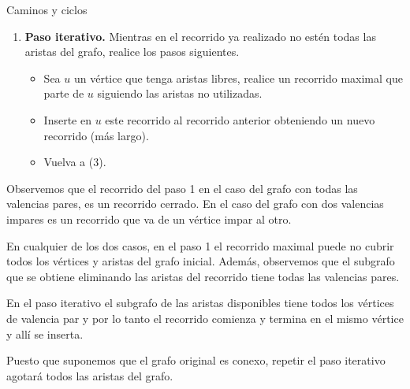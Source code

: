 \begin{section}{Caminos y ciclos}
\begin{enumerate}
    \item \textbf{Paso iterativo.} Mientras en el recorrido ya realizado no estén todas las aristas del grafo, realice los pasos siguientes.    
    \begin{itemize}
        \item Sea $u$  un vértice que tenga aristas libres, realice un recorrido maximal que parte de $u$ siguiendo las aristas no utilizadas. 
        \item Inserte en $u$ este recorrido al recorrido  anterior obteniendo un nuevo recorrido (más largo).
        \item  Vuelva a (3). 
    \end{itemize}
\end{enumerate}



Observemos que el recorrido del paso 1 en el caso del grafo con todas las valencias pares, es un recorrido cerrado. En el caso del grafo con dos valencias impares es un recorrido que va de un vértice impar al otro.  
    
En  cualquier de los dos casos,  en el paso 1 el recorrido maximal puede no cubrir todos los vértices y aristas del grafo inicial. Además,  observemos que el subgrafo que se obtiene eliminando las aristas del recorrido tiene todas las valencias pares. 

En  el paso iterativo el subgrafo de las aristas disponibles tiene todos los vértices de valencia par y por lo tanto el recorrido comienza y  termina en el mismo vértice y allí se inserta.

Puesto que suponemos que el grafo original es conexo, repetir el paso iterativo agotará todos las aristas del grafo.

\begin{comment}
El  algoritmo es el siguiente: 
\begin{enumerate}
    \item \textbf{Paso 1.} Elija cualquier vértice  inicial $v$ y haga una caminata  que no repita aristas y  que vuelva al vértice (de $v$ a $v$). 
    
    El recorrido formado de esta manera es un recorrido cerrado, pero puede no cubrir todos los vértices y aristas del grafo inicial.

    \item \textbf{Paso iterativo} Mientras exista un vértice $u$ en la caminata ya realizada, pero que tenga aristas que no formen parte de la caminata, inicie otra caminata desde $u$ hasta $u$ siguiendo las aristas no utilizadas. Luego,  inserte esta  caminata a la caminata  anterior para formar una caminata nueva (más larga).
    

\end{comment}
\end{section}
